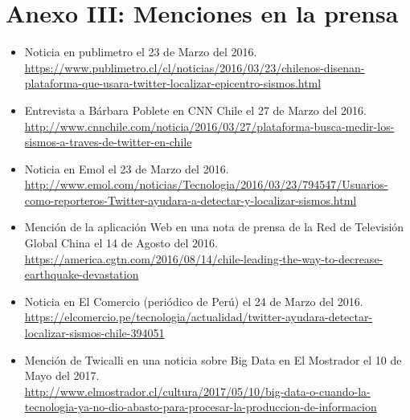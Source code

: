 \chapter*{Anexo III: Menciones en la prensa}
\label{anexo:prensa}

\begin{itemize}
\item Noticia en publimetro el 23 de Marzo del 2016. \\
{\tiny \url{https://www.publimetro.cl/cl/noticias/2016/03/23/chilenos-disenan-plataforma-que-usara-twitter-localizar-epicentro-sismos.html}}
\item Entrevista a Bárbara Poblete en CNN Chile el 27 de Marzo del 2016.\\ 
{\tiny \url{http://www.cnnchile.com/noticia/2016/03/27/plataforma-busca-medir-los-sismos-a-traves-de-twitter-en-chile}}
\item Noticia en Emol el 23 de Marzo del 2016.\\
{\tiny \url{http://www.emol.com/noticias/Tecnologia/2016/03/23/794547/Usuarios-como-reporteros-Twitter-ayudara-a-detectar-y-localizar-sismos.html}}
\item Mención de la aplicación Web en una nota de prensa de la Red de Televisión Global China el 14 de Agosto del 2016.\\
{\tiny \url{https://america.cgtn.com/2016/08/14/chile-leading-the-way-to-decrease-earthquake-devastation}}
\item Noticia en El Comercio (periódico de Perú) el 24 de Marzo del 2016.\\
{\tiny \url{https://elcomercio.pe/tecnologia/actualidad/twitter-ayudara-detectar-localizar-sismos-chile-394051}}
\item Mención de Twicalli en una noticia sobre Big Data en El Mostrador el 10 de Mayo del 2017.\\
{\tiny \url{http://www.elmostrador.cl/cultura/2017/05/10/big-data-o-cuando-la-tecnologia-ya-no-dio-abasto-para-procesar-la-produccion-de-informacion}}
\end{itemize}